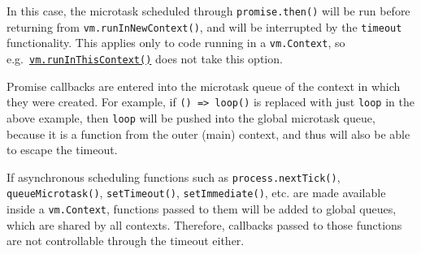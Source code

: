 In this case, the microtask scheduled through \texttt{promise.then()}
will be run before returning from \texttt{vm.runInNewContext()}, and
will be interrupted by the \texttt{timeout} functionality. This applies
only to code running in a \texttt{vm.Context}, so
e.g.~\hyperref[vmruninthiscontextcode-options]{\texttt{vm.runInThisContext()}}
does not take this option.

Promise callbacks are entered into the microtask queue of the context in
which they were created. For example, if
\texttt{()\ =\textgreater{}\ loop()} is replaced with just \texttt{loop}
in the above example, then \texttt{loop} will be pushed into the global
microtask queue, because it is a function from the outer (main) context,
and thus will also be able to escape the timeout.

If asynchronous scheduling functions such as
\texttt{process.nextTick()}, \texttt{queueMicrotask()},
\texttt{setTimeout()}, \texttt{setImmediate()}, etc. are made available
inside a \texttt{vm.Context}, functions passed to them will be added to
global queues, which are shared by all contexts. Therefore, callbacks
passed to those functions are not controllable through the timeout
either.

